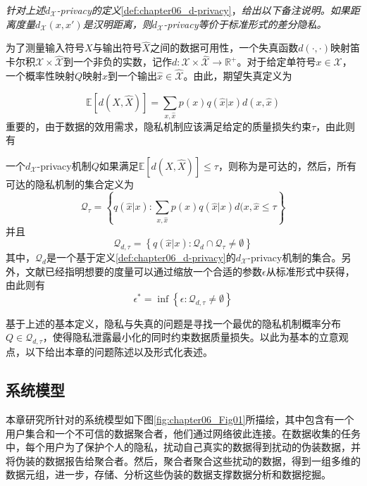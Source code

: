\begin{remark}{\em
针对上述$d_{\mathcal{X}}$-privacy的定义}\ref{def:chapter06_d-privacy}，{\em 给出以下备注说明。如果距离度量$d_{\mathcal{X}}(x,x')$是汉明距离，则$d_{\mathcal{X}}$-privacy等价于标准形式的差分隐私。}
\end{remark}

为了测量输入符号$X$与输出符号$\hat{X}$之间的数据可用性，一个失真函数$d(\cdot,\cdot)$映射笛卡尔积$\mathcal{X}\times \hat{\mathcal{X}}$到一个非负的实数，记作$d:\mathcal{X}\times \hat{\mathcal{X}} \rightarrow \mathbb{R}^{+}$。对于给定单符号$x \in \mathcal{X}$，一个概率性映射$Q$映射$x$到一个输出$\hat{x} \in \hat{\mathcal{X}}$。由此，期望失真定义为

\begin{equation}
\mathbb{E}[d(X,\hat{X})] = \sum_{x,\hat{x}}p(x) q(\hat{x}|x)d(x,\hat{x})
\end{equation}
重要的，由于数据的效用需求，隐私机制应该满足给定的质量损失约束$\tau$，由此则有

\begin{definition}
	一个$d_{\mathcal{X}}$-privacy机制$Q$如果满足$\mathbb{E}[d(X,\hat{X})] \leq \tau$，则称为是可达的，然后，所有可达的隐私机制的集合定义为
	\begin{equation}
		\mathcal{Q}_{\tau} = \left\{q(\hat{x}|x):\sum_{x,\hat{x}}p(x) q(\hat{x}|x)d(x,\hat{x} \leq \tau \right\}
	\end{equation}
并且
\begin{equation}
	\mathcal{Q}_{d,\tau}=\left \{q(\hat{x}|x):\mathcal{Q}_{d} \cap \mathcal{Q}_{\tau} \neq \emptyset \right\}
\end{equation}
其中，$\mathcal{Q}_d$是一个基于定义\textup{\ref{def:chapter06_d-privacy}}的$d_{\mathcal{X}}$-privacy机制的集合。另外，文献\textup{}已经指明想要的度量可以通过缩放一个合适的参数$\epsilon$从标准形式中获得，由此则有
\begin{equation}
\epsilon^* = \inf\left\{\epsilon: \mathcal{Q}_{d,\tau} \neq \emptyset \right\}
\end{equation}
\end{definition}

基于上述的基本定义，隐私与失真的问题是寻找一个最优的隐私机制概率分布$Q \in \mathcal{Q}_{d,\tau}$，使得隐私泄露最小化的同时约束数据质量损失。以此为基本的立意观点，以下给出本章的问题陈述以及形式化表述。

\subsection{系统模型}\label{subsec:system_model}
本章研究所针对的系统模型如下图\ref{fig:chapter06_Fig01}所描绘，其中包含有一个用户集合和一个不可信的数据聚合者，他们通过网络彼此连接。在数据收集的任务中，每个用户为了保护个人的隐私，扰动自己真实的数据得到扰动的伪装数据，并将伪装的数据报告给聚合者。然后，聚合者聚合这些扰动的数据，得到一组多维的数据元组，进一步，存储、分析这些伪装的数据支撑数据分析和数据挖掘。


